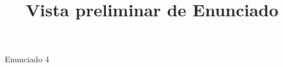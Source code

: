 \documentclass[a4paper,10pt]{article}\usepackage[utf8]{inputenc}\usepackage[spanish]{babel}\usepackage{arial}
\title{Vista preliminar de Enunciado}
\begin{document}
\twocolumn 

\maketitle

Enunciado 4
\end{document}
